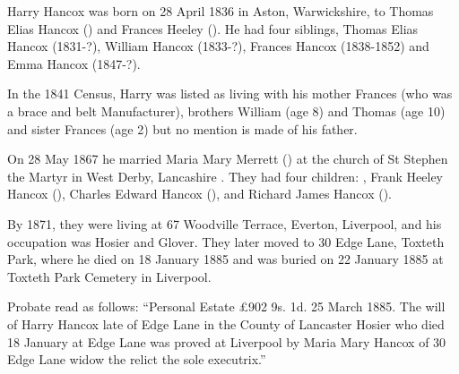 
Harry Hancox was born on 28 April 1836 in Aston, Warwickshire, to Thomas Elias Hancox () and Frances Heeley ().  He had four siblings, Thomas Elias Hancox (1831-?), William Hancox (1833-?), Frances Hancox (1838-1852) and Emma Hancox (1847-?). 

In the 1841 Census, Harry was listed as living with his mother Frances (who was a brace and belt Manufacturer), brothers William (age 8) and Thomas (age 10) and sister Frances (age 2) but no mention is made of his father. \cite{HarryHancoxBirth}

On 28 May 1867 he married Maria Mary Merrett () at the church of St Stephen the Martyr in West Derby, Lancashire \cite{HarryHancoxMarriage}.  They had four children: , Frank Heeley Hancox (), Charles Edward Hancox (), and Richard James Hancox ().

By 1871, they were living at 67 Woodville Terrace, Everton, Liverpool, and his occupation was Hosier and Glover.\cite{HarryHancoxOccupation}  They later moved to 30 Edge Lane, Toxteth Park, where he died on 18 January 1885 \cite{HarryHancoxDeath} and was buried on 22 January 1885 at Toxteth Park Cemetery in Liverpool.\cite{HHGravestone}

Probate read as follows: ``Personal Estate \pounds 902 9s. 1d. 25 March 1885. The will of Harry Hancox late of Edge Lane in the County of Lancaster Hosier who died 18 January at Edge Lane was proved at Liverpool by Maria Mary Hancox of 30 Edge Lane widow the relict the sole executrix.''
